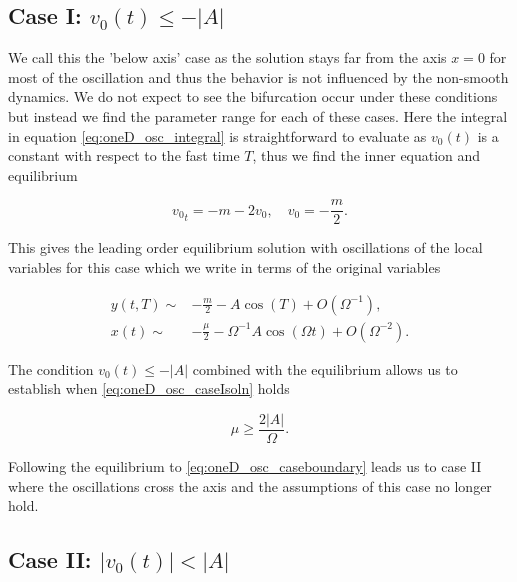 \subsection{Case I: $v_0(t) \le -|A|$}
\label{subsec:oneD_osc_CaseI}

We call this the 'below axis' case as the solution stays far from the axis $x=0$ for most of the oscillation and thus the behavior is not influenced by the non-smooth dynamics. We do not expect to see the bifurcation occur under these conditions but instead we find the parameter range for each of these cases. Here the integral in equation \eqref{eq:oneD_osc_integral} is straightforward to evaluate as $v_0(t)$ is a constant with respect to the fast time $T$, thus we find the inner equation and equilibrium

\begin{equation*}
{v_0}_t=-m-2v_0,\quad v_0=-\frac{m}{2}.
\end{equation*}

This gives the leading order equilibrium solution with oscillations of the local variables for this case which we write in terms of the original variables

\begin{equation}\label{eq:oneD_osc_caseIsoln}
\begin{aligned}
y(t,T)\sim& -\frac{m}{2}-A\cos(T)+O(\Omega^{-1}),\\ 
x(t)\sim& -\frac{\mu}{2}-\Omega^{-1} A\cos(\Omega t)+O(\Omega^{-2}).
\end{aligned}
\end{equation}

The condition $v_0(t)\le -|A|$ combined with the equilibrium allows us to establish when \eqref{eq:oneD_osc_caseIsoln} holds

\begin{equation}\label{eq:oneD_osc_caseboundary}
\mu\ge \frac{2|A|}{\Omega}.
\end{equation}

Following the equilibrium to \eqref{eq:oneD_osc_caseboundary} leads us to case II where the oscillations cross the axis and the assumptions of this case no longer hold.

\subsection{Case II: $|v_0(t)|< |A|$}
\label{subsec:oneD_osc_CaseII}

